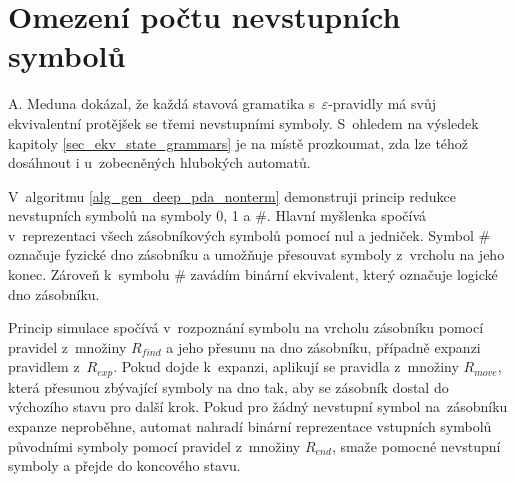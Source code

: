 \section{Omezení počtu nevstupních symbolů}

A. Meduna \cite{Meduna:StateGrammars} dokázal, že každá stavová gramatika s~$\varepsilon$-pravidly má svůj ekvivalentní protějšek se třemi nevstupními symboly. S~ohledem na výsledek kapitoly \ref{sec_ekv_state_grammars} je na místě prozkoumat, zda lze téhož dosáhnout i u~zobecněných hlubokých automatů.

V~algoritmu \ref{alg_gen_deep_pda_nonterm} demonstruji princip redukce nevstupních symbolů na symboly 0, 1 a \#. Hlavní myšlenka spočívá v~reprezentaci všech zásobníkových symbolů pomocí nul a jedniček. Symbol \# označuje fyzické dno zásobníku a umožňuje přesouvat symboly z~vrcholu na jeho konec. Zároveň k~symbolu \# zavádím binární ekvivalent, který označuje logické dno zásobníku. 

Princip simulace spočívá v~rozpoznání symbolu na vrcholu zásobníku pomocí pravidel z~množiny $R_{find}$ a jeho přesunu na dno zásobníku, případně expanzi pravidlem z~$R_{exp}$. Pokud dojde k~expanzi, aplikují se pravidla z~množiny $R_{move}$, která přesunou zbývající symboly na dno tak, aby se zásobník dostal do výchozího stavu pro další krok. Pokud pro žádný nevstupní symbol na~zásobníku expanze neproběhne, automat nahradí binární reprezentace vstupních symbolů původními symboly pomocí pravidel z~množiny $R_{end}$, smaže pomocné nevstupní symboly a přejde do koncového stavu.

